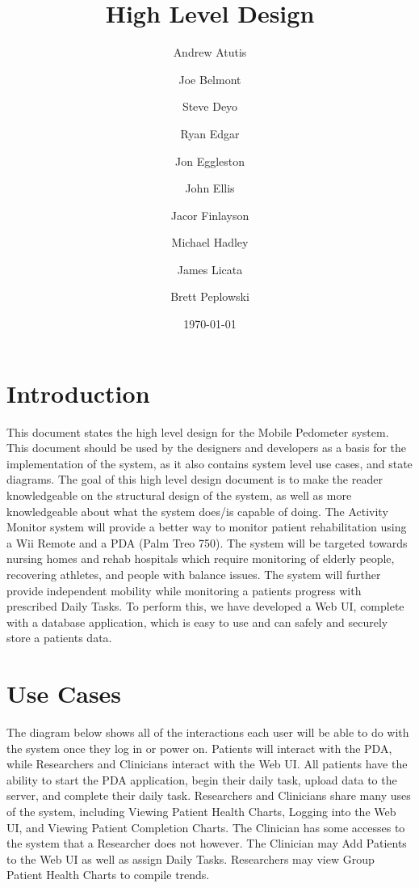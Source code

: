 \documentclass{article}
\title{High Level Design}
\author{Andrew Atutis \and Joe Belmont \and Steve Deyo \and Ryan Edgar \and Jon Eggleston \and John Ellis \and Jacor Finlayson \and Michael Hadley \and James Licata \and Brett Peplowski}
\date{\today}
\begin{document}
\begin{titlepage}
\maketitle
\end{titlepage}


\tableofcontents

\newpage

\section{Introduction}
This document states the high level design for the Mobile Pedometer system. This document should be used by the designers and developers as a basis for the implementation of the system, as it also contains system level use cases, and state diagrams.  The goal of this high level design document is to make the reader knowledgeable on the structural design of the system, as well as more knowledgeable about what the system does/is capable of doing.
The Activity Monitor system will provide a better way to monitor patient rehabilitation using a Wii Remote and a PDA (Palm Treo 750). The system will be targeted towards nursing homes and rehab hospitals which require monitoring of elderly people, recovering athletes, and people with balance issues. The system will further provide independent mobility while monitoring a patients progress with prescribed Daily Tasks. 
To perform this, we have developed a Web UI, complete with a database application, which is easy to use and can safely and securely store a patients data.

\newpage

\section{Use Cases}
The diagram below shows all of the interactions each user will be able to do with the system once they log in or power on. Patients will interact with the PDA, while Researchers and Clinicians interact with the Web UI.
All patients have the ability to start the PDA application, begin their daily task, upload data to the server, and complete their daily task.
Researchers and Clinicians share many uses of the system, including Viewing Patient Health Charts, Logging into the Web UI, and Viewing Patient Completion Charts. The Clinician has some accesses to the system that a Researcher does not however. The Clinician may Add Patients to the Web UI as well as assign Daily Tasks.
Researchers may view Group Patient Health Charts to compile trends.
\end{document}
